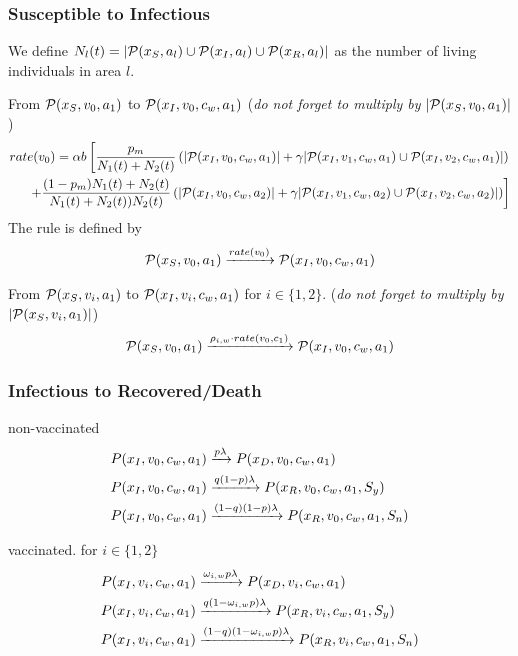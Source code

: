 \subsubsection*{Susceptible to Infectious}
We define $N_l(t) = |\mathcal{P}(x_S, a_l) \cup \mathcal{P}(x_I, a_l) \cup \mathcal{P}(x_R, a_l)|$ as the number of living individuals in area $l$.

From $\mathcal{P}(x_S, v_0, a_1)$ to $\mathcal{P}(x_I, v_0, c_w, a_1)$ (\textit{do not forget to multiply by} $|\mathcal{P}(x_S, v_0, a_1)|$)
\begin{align*}
rate(v_0) = \alpha b \left[ \frac{p_m}{N_1(t) + N_2(t)} \left(|\mathcal{P}(x_I, v_0, c_w, a_1)| + \gamma |\mathcal{P}(x_I, v_1, c_w, a_1) \cup \mathcal{P}(x_I, v_2, c_w, a_1)|\right) \right. \notag \\
\left. + \frac{(1-p_m)N_1(t) + N_2(t)}{N_1(t) + N_2(t))N_2(t)}  \left(|\mathcal{P}(x_I, v_0, c_w, a_2)| + \gamma |\mathcal{P}(x_I, v_1, c_w, a_2) \cup \mathcal{P}(x_I, v_2, c_w, a_2)|\right) \right]
\end{align*}
The rule is defined by 
\begin{align*}
\mathcal{P}(x_S, v_0, a_1) \xrightarrow{rate(v_0)} \mathcal{P}(x_I, v_0, c_w, a_1)
\end{align*}

From $\mathcal{P}(x_S, v_i, a_1)$ to $\mathcal{P}(x_I, v_i, c_w, a_1)$ for $i \in \{1,2\}$. (\textit{do not forget to multiply by} $|\mathcal{P}(x_S, v_i, a_1)|$)
\begin{align*}
\mathcal{P}(x_S, v_0, a_1) \xrightarrow{\rho_{i,w} \cdot rate(v_0, c_1) } \mathcal{P}(x_I, v_0, c_w, a_1)
\end{align*}

\subsubsection*{Infectious to Recovered/Death}
non-vaccinated
\begin{align}
    P(x_I,  v_0, c_w, a_1) &\xrightarrow{p \lambda} P(x_D,  v_0, c_w, a_1) \notag \\
P(x_I,  v_0, c_w, a_1) &\xrightarrow{q(1-p) \lambda} P(x_R,  v_0, c_w, a_1, S_y) \notag \\
P(x_I,  v_0, c_w, a_1) &\xrightarrow{(1-q)(1-p) \lambda} P(x_R,  v_0, c_w, a_1, S_n) \notag
\end{align}

vaccinated. for $i \in \{1,2\}$
\begin{align}
    P(x_I,  v_i, c_w, a_1) &\xrightarrow{\omega_{i,w} p \lambda} P(x_D,  v_i, c_w, a_1) \notag \\
P(x_I,  v_i, c_w, a_1) &\xrightarrow{q(1-\omega_{i,w}p) \lambda} P(x_R,  v_i, c_w, a_1, S_y) \notag \\
P(x_I,  v_i, c_w, a_1) &\xrightarrow{(1-q)(1-\omega_{i,w}p) \lambda} P(x_R,  v_i, c_w, a_1, S_n) \notag
\end{align}


